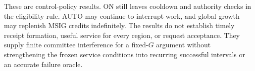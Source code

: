 These are control-policy results. ON still leaves cooldown and authority
checks in the eligibility rule. AUTO may continue to interrupt work, and
global growth may replenish MSIG credits indefinitely. The results do
not establish timely receipt formation, useful service for every region,
or request acceptance. They supply finite committee interference for a
fixed-$G$ argument without strengthening the frozen service conditions
into recurring successful intervals or an accurate failure oracle.
